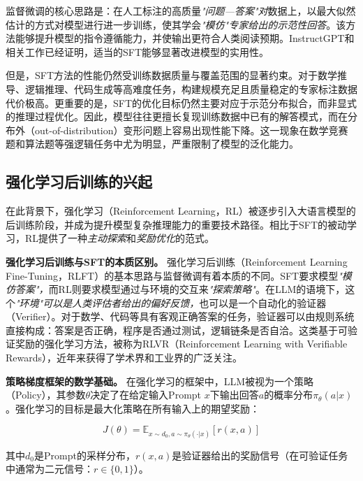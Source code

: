 监督微调的核心思路是：在人工标注的高质量\textit{"问题—答案"对}数据上，以最大似然估计的方式对模型进行进一步训练，使其学会\textit{"模仿"专家给出的示范性回答}。该方法能够提升模型的指令遵循能力，并使输出更符合人类阅读预期。InstructGPT\cite{ouyang2022training}和相关工作已经证明，适当的SFT能够显著改进模型的实用性。

但是，SFT方法的性能仍然受训练数据质量与覆盖范围的显著约束。对于数学推导、逻辑推理、代码生成等高难度任务，构建规模充足且质量稳定的专家标注数据代价极高。更重要的是，SFT的优化目标仍然主要对应于示范分布拟合，而非显式的推理过程优化。因此，模型往往更擅长复现训练数据中已有的解答模式，而在分布外（out-of-distribution）变形问题上容易出现性能下降。这一现象在数学竞赛题和算法题等强逻辑任务中尤为明显，严重限制了模型的泛化能力。

\subsection{强化学习后训练的兴起}
\label{subsec:rl_training}

在此背景下，强化学习（Reinforcement Learning，RL）被逐步引入大语言模型的后训练阶段，并成为提升模型复杂推理能力的重要技术路径。相比于SFT的被动学习，RL提供了一种\textit{主动探索}和\textit{奖励优化}的范式。

\textbf{强化学习后训练与SFT的本质区别。} 强化学习后训练（Reinforcement Learning Fine-Tuning，RLFT）的基本思路与监督微调有着本质的不同。SFT要求模型\textit{"模仿答案"，}而RL则要求模型通过与环境的交互来\textit{"探索策略"}。在LLM的语境下，这个\textit{"环境"可以是人类评估者给出的偏好反馈，}也可以是一个自动化的验证器（Verifier）。对于数学、代码等具有客观正确答案的任务，验证器可以由规则系统直接构成：答案是否正确，程序是否通过测试，逻辑链条是否自洽。这类基于可验证奖励的强化学习方法，被称为RLVR（Reinforcement Learning with Verifiable Rewards）\cite{deepseek2024reasoning}，近年来获得了学术界和工业界的广泛关注。

\textbf{策略梯度框架的数学基础。} 在强化学习的框架中，LLM被视为一个策略（Policy），其参数$\theta$决定了在给定输入Prompt $x$下输出回答$a$的概率分布$\pi_\theta(a|x)$。强化学习的目标是最大化策略在所有输入上的期望奖励：

\begin{equation}
J(\theta) = \mathbb{E}_{x \sim d_0, a \sim \pi_\theta(\cdot|x)} [r(x, a)]
\label{eq:rl_objective}
\end{equation}

其中$d_0$是Prompt的采样分布，$r(x, a)$是验证器给出的奖励信号（在可验证任务中通常为二元信号：$r \in \{0, 1\}$）。

